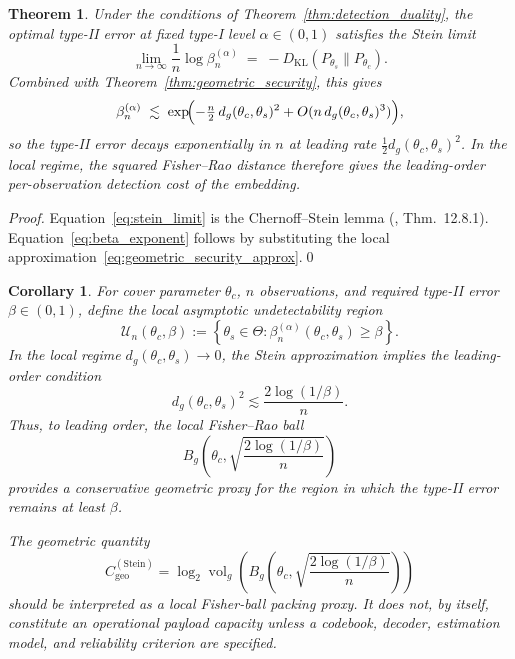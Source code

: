 \documentclass[a4paper,fleqn]{cas-dc}
\newtheorem{theorem}{Theorem}
\newtheorem{corollary}{Corollary}
\DeclareMathOperator{\vol}{vol}
\newcommand{\DKL}{D_{\mathrm{KL}}}
\begin{document}
\begin{theorem}%
\label{thm:stein_exponent}
Under the conditions of Theorem~\ref{thm:detection_duality}, the optimal
type-II error at fixed type-I level $\alpha\in(0,1)$ satisfies the Stein limit
\begin{equation}
  \lim_{n\to\infty}\frac{1}{n}\log\beta_n^{(\alpha)}
  \;=\;-\DKL(P_{\theta_s}\|P_{\theta_c}).
  \label{eq:stein_limit}
\end{equation}
Combined with Theorem~\ref{thm:geometric_security}, this gives
\begin{equation}
  \beta_n^{(\alpha)}
  \;\lesssim\;
  \exp\!\Bigl(-\tfrac{n}{2}\,d_g(\theta_c,\theta_s)^2
              + O(n\,d_g(\theta_c,\theta_s)^3)\Bigr),
  \label{eq:beta_exponent}
\end{equation}
so the type-II error decays exponentially in $n$ at leading rate
$\frac{1}{2}d_g(\theta_c,\theta_s)^2$.
In the local regime, the squared Fisher--Rao distance therefore gives the
leading-order per-observation detection cost of the embedding.
\end{theorem}

\begin{proof}
Equation~\eqref{eq:stein_limit} is the Chernoff--Stein lemma
(\cite{cover2006elements}, Thm.~12.8.1).
Equation~\eqref{eq:beta_exponent} follows by substituting the local
approximation~\eqref{eq:geometric_security_approx}.\qed
\end{proof}

\begin{corollary}
\label{cor:undetectable_ball}
For cover parameter $\theta_c$, $n$ observations, and required type-II
error $\beta\in(0,1)$, define the local asymptotic undetectability region
\[
  \mathcal{U}_n(\theta_c,\beta)
  :=
  \left\{
    \theta_s\in\Theta :
    \beta_n^{(\alpha)}(\theta_c,\theta_s)\geq\beta
  \right\}.
\]
In the local regime $d_g(\theta_c,\theta_s)\to 0$, the Stein approximation
implies the leading-order condition
\[
  d_g(\theta_c,\theta_s)^2
  \lesssim
  \frac{2\log(1/\beta)}{n}.
\]
Thus, to leading order, the local Fisher--Rao ball
\[
  B_g\!\left(
    \theta_c,\sqrt{\frac{2\log(1/\beta)}{n}}
  \right)
\]
provides a conservative geometric proxy for the region in which the
type-II error remains at least $\beta$.

The geometric quantity
\[
C_{\mathrm{geo}}^{(\mathrm{Stein})}
=
\log_2\vol_g\!\left(
B_g\!\left(
\theta_c,\sqrt{\frac{2\log(1/\beta)}{n}}
\right)
\right)
\]
should be interpreted as a local Fisher-ball packing proxy. It does not,
by itself, constitute an operational payload capacity unless a codebook,
decoder, estimation model, and reliability criterion are specified.
\end{corollary}
\end{document}
